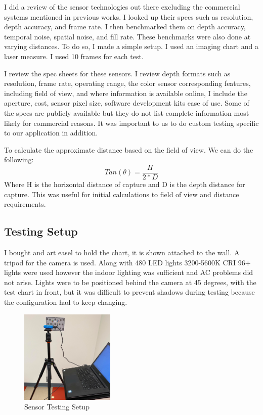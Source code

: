 I did a review of the sensor technologies out there excluding the commercial systems mentioned in previous works. I looked up their specs such as resolution, depth accuracy, and frame rate. I then benchmarked them on depth accuracy, temporal noise, spatial noise, and fill rate. These benchmarks were also done at varying distances. To do so, I made a simple setup. I used an imaging chart and a laser measure. I used 10 frames for each test.

I review the spec sheets for these sensors. I review depth formats such as resolution, frame rate, operating range, the color sensor corresponding features, including field of view, and where information is available online, I include the aperture, cost, sensor pixel size, software development kits ease of use.
Some of the specs are publicly available but they do not list complete information most likely for commercial reasons. It was important to us to do custom testing specific to our application in addition.

To calculate the approximate distance based on the field of view. We can do the following:
\begin{equation}
	Tan(\theta) = \frac{H}{2 * D}
\end{equation}
Where H is the horizontal distance of capture and D is the depth distance for capture. This was useful for initial calculations to field of view and distance requirements.
\subsection{Testing Setup}
I bought and art easel to hold the chart, it is shown attached to the wall. A tripod for the camera is used. Along with 480 LED lights 3200-5600K CRI 96+ lights were used however the indoor lighting was sufficient and AC problems did not arise. Lights were to be positioned behind the camera at 45 degrees, with the test chart in front, but it was difficult to prevent shadows during testing because the configuration had to keep changing. 
\begin{figure}[!htb]
	\caption{Sensor Testing Setup}
	\centering
	\includegraphics[width=0.4\textwidth, angle=0]{images/sensor_testing.png}
\end{figure}

